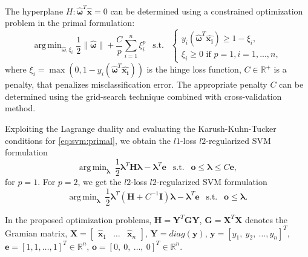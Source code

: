 \documentclass{aip-cp}
\DeclareMathOperator*{\argmin}{arg\,min}
\begin{document}
The hyperplane \(H: \boldsymbol{\widehat{\omega}}^T\boldsymbol{\widehat{x}}=0\) can be determined using a constrained optimization problem in the primal formulation:
\begin{equation}
    \argmin_{\boldsymbol{\widehat{\omega}},\xi_i} \frac{1}{2}\|\boldsymbol{\widehat{\omega}}\| + \frac{C}{p}\sum_{i = 1}^n\xi_i^p ~~\text{ s.t. } ~~
    \begin{cases}
        y_i(\boldsymbol{\widehat{\omega}}^T\boldsymbol{\widehat{x_i}})\geq1 - \xi_i,\\
        \xi_i \geq 0 \text{ if } p=1, i=1, ...,n,
    \end{cases}
    \label{eq:svm:primal}
\end{equation}
where \(\xi_i = \max(0, 1-y_i(\boldsymbol{\widehat{\omega}}^T\boldsymbol{\widehat{x_i}}))\) is the hinge loss function, \(C \in \mathbb{R}^+\) is a penalty, that penalizes misclassification error. The appropriate penalty $C$ can be determined using the grid-search technique combined with cross-validation method.

Exploiting the Lagrange duality and evaluating the Karush-Kuhn-Tucker conditions for \eqref{eq:svm:primal},
we obtain the $l1$-loss $l2$-regularized SVM formulation
\begin{equation}
    \argmin_{\boldsymbol{\lambda}} \ \frac{1}{2} \boldsymbol{\lambda}^T \boldsymbol{H}  \boldsymbol{\lambda} -  \boldsymbol{\lambda}^T \boldsymbol{e} ~~\text{ s.t. }~~ \boldsymbol{o} \leq  \boldsymbol{\lambda} \leq C\boldsymbol{e},
    \label{eq:svm:dualL1}
\end{equation}
for $p=1$. For $p=2$, we get the $l2$-loss $l2$-regularized SVM formulation
\begin{equation}
    \argmin_{\boldsymbol{\lambda}} \ \frac{1}{2} \boldsymbol{\lambda}^T \left(\boldsymbol{H} + C^{-1} \boldsymbol{I} \right) \boldsymbol{\lambda} -  \boldsymbol{\lambda}^T \boldsymbol{e} ~~\text{ s.t. }~~    \boldsymbol{o} \leq  \boldsymbol{\lambda}.
    \label{eq:svm:dualL2}
\end{equation}

In the proposed optimization problems, $\boldsymbol{H} = \boldsymbol{Y}^T \boldsymbol{G} \boldsymbol{Y}$, $\boldsymbol{G} = \boldsymbol{X}^T\boldsymbol{X}$ denotes the Gramian matrix, $\boldsymbol{X}= \begin{bmatrix} \boldsymbol{\widehat{x}}_1 & \dots & \boldsymbol{\widehat{x}}_n \end{bmatrix}$, $\boldsymbol{Y} = diag(\boldsymbol{y})$, $\boldsymbol{y} = \left[y_1, \ y_2, \  \dots, y_n\right]^T$, $\boldsymbol{e} = \left[1, 1, \dots, 1\right]^T \in \mathbb{R}^n$, $\boldsymbol{o} = \left[0, \ 0,  \ \dots, \ 0\right]^T \in \mathbb{R}^n$.
\end{document}
